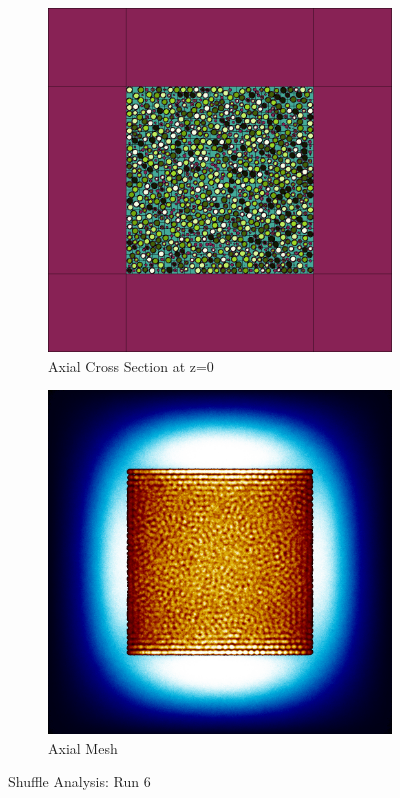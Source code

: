 \begin{figure}[H]
\begin{subfigure}{0.45\textwidth}
  \includegraphics[width=0.95\linewidth]{figures/6012345/6012345-v}
  \caption{Axial Cross Section at z=0 }
  \label{fig:6012345-v}
\end{subfigure}
%
\begin{subfigure}{0.45\textwidth}
  \includegraphics[width=0.95\linewidth]{figures/6012345/6012345-vm}
  \caption{Axial Mesh}
  \label{fig:6012345-vm}
\end{subfigure}
%
\caption{Shuffle Analysis: Run 6}
\label{fig:6012345}
\end{figure}